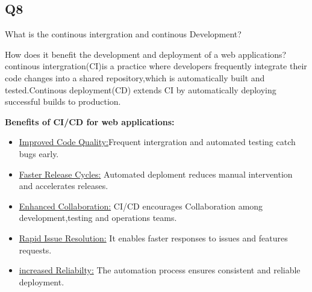 \documentclass{article}
\begin{document}
\subsection{Q8}What is the continous intergration and continous Development?\par How does it benefit the development and deployment of a web applications?
continous intergration(CI)is a practice where developers frequently integrate their code changes into a shared repository,which is automatically built and tested.Continous deployment(CD) extends CI by automatically deploying successful builds to production.\par
    \textbf{Benefits of CI/CD for web applications:}
\begin{itemize}
    \item \underline{Improved Code Quality:}Frequent intergration and automated testing catch bugs early.
    \item \underline{Faster Release Cycles:} Automated deploment reduces manual intervention and accelerates releases.
    \item \underline{Enhanced Collaboration:} CI/CD encourages Collaboration among development,testing and operations teams.
    \item \underline{Rapid Issue Resolution:} It enables faster responses to issues and features requests.
    \item \underline{increased Reliabilty:} The automation process ensures consistent and reliable deployment. 
\end{itemize}
\end{document}
